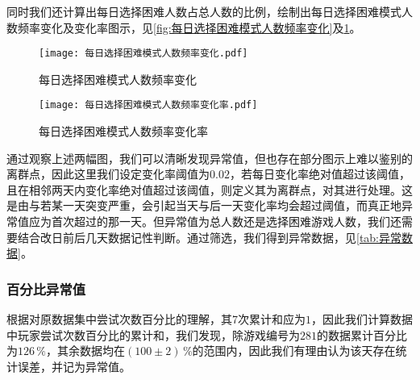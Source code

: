 \documentclass{MathModeling}
\begin{document}
	同时我们还计算出每日选择困难人数占总人数的比例，绘制出每日选择困难模式人数频率变化及变化率图示，见\textcolor{blue}{\cref{fig:每日选择困难模式人数频率变化}}及\textcolor{blue}{\cref{fig:每日选择困难模式人数频率变化率}}。
	\begin{figure}[H]
		\centering
		\begin{minipage}{0.48\linewidth}
			\centering
			\texttt{[image: 每日选择困难模式人数频率变化.pdf]}
			\caption{每日选择困难模式人数频率变化}
			\label{fig:每日选择困难模式人数频率变化}
		\end{minipage}
		\begin{minipage}{0.48\linewidth}
			\centering
			\texttt{[image: 每日选择困难模式人数频率变化率.pdf]}
			\caption{每日选择困难模式人数频率变化率}
			\label{fig:每日选择困难模式人数频率变化率}
		\end{minipage}
	\end{figure}
	通过观察上述两幅图，我们可以清晰发现异常值，但也存在部分图示上难以鉴别的离群点，因此这里我们设定变化率阈值为$0.02$，若每日变化率绝对值超过该阈值，且在相邻两天内变化率绝对值超过该阈值，则定义其为离群点，对其进行处理。这是由与若某一天突变严重，会引起当天与后一天变化率均会超过阈值，而真正地异常值应为首次超过的那一天。但异常值为总人数还是选择困难游戏人数，我们还需要结合改日前后几天数据记性判断。通过筛选，我们得到异常数据，见\textcolor{blue}{\cref{tab:异常数据}}。
\begin{table}[H]
	\centering
	\caption{异常数据分析}
	\label{tab:异常数据}
\end{table}

	\subsubsection{百分比异常值}
	根据对原数据集中尝试次数百分比的理解，其7次累计和应为$1$，因此我们计算数据中玩家尝试次数百分比的累计和，我们发现，除游戏编号为$281$的数据累计百分比为$126\,\%$，其余数据均在$\left(100\pm2\right)\,\%$的范围内，因此我们有理由认为该天存在统计误差，并记为异常值。
\end{document}
